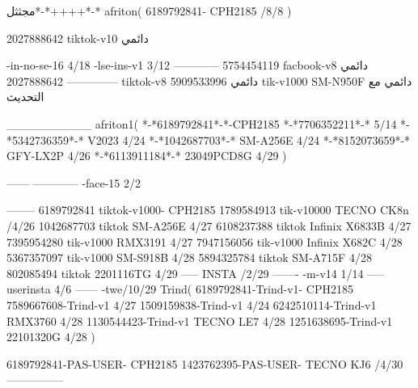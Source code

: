 مجثثل*-*++++*-*
afriton(
6189792841- CPH2185  /8/8
)

2027888642 tiktok-v10
دائمي

-in-no-se-16 4/18
-lse-ins-v1 3/12
------------
5754454119 facbook-v8
دائمي
--------------
2027888642 tiktok-v8
دائمي
5909533996 tik-v1000  SM-N950F
دائمي مع التحديث

__________
afriton1(
*-*6189792841*-*-CPH2185
*-*7706352211*-* 5/14
*-*5342736359*-* V2023 4/24
*-*1042687703*-* SM-A256E 4/24
*-*8152073659*-* GFY-LX2P 4/26
*-*6113911184*-* 23049PCD8G 4/29
)


------
------------
-face-15 2/2

--------
6189792841 tiktok-v1000- CPH2185 
1789584913 tik-v10000 TECNO CK8n /4/26
1042687703 tiktok SM-A256E 4/27
6108237388 tiktok  Infinix X6833B 4/27
7395954280 tik-v1000  RMX3191 4/27
7947156056 tik-v1000  Infinix X682C 4/28
5367357097 tik-v1000  SM-S918B 4/28
5894325784 tiktok SM-A715F  4/28
802085494 tiktok 2201116TG  4/29
-----
 INSTA /2/29
-------
-m-v14 1/14
-----
userinsta 4/6
------
-twe/10/29
Trind(
6189792841-Trind-v1- CPH2185 
7589667608-Trind-v1  4/27
1509159838-Trind-v1  4/24
6242510114-Trind-v1 RMX3760 4/28
1130544423-Trind-v1 TECNO LE7 4/28
1251638695-Trind-v1 22101320G 4/28
)

6189792841-PAS-USER- CPH2185 
1423762395-PAS-USER- TECNO KJ6 /4/30
    ---------------
